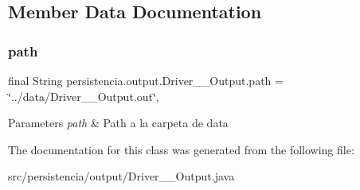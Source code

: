 \subsection{Member Data Documentation}
\mbox{\label{classpersistencia_1_1output_1_1Driver____Output_a1701bae356c7bf388a5466895c22ff64}} 
\subsubsection{\texorpdfstring{path}{path}}
{\footnotesize\ttfamily final String persistencia.\+output.\+Driver\+\_\+\+\_\+\+Output.\+path = \char`\"{}../data/Driver\+\_\+\+\_\+\+Output.\+out\char`\"{}\hspace{0.3cm}{\ttfamily [static]}, {\ttfamily [package]}}


\begin{DoxyParams}{Parameters}
{\em path} & Path a la carpeta de data \\
\hline
\end{DoxyParams}


The documentation for this class was generated from the following file\+:\begin{DoxyCompactItemize}
\item 
src/persistencia/output/Driver\+\_\+\+\_\+\+Output.\+java\end{DoxyCompactItemize}

